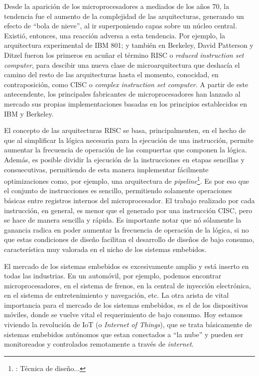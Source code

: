 \documentclass[a4paper]{article}
\begin{document}
Desde la aparición de los microprocesadores a mediados de los años 70, la tendencia fue el aumento de la complejidad de las arquitecturas, generando un efecto de ``bola de nieve'', al ir superponiendo capas sobre un núcleo central. Existió, entonces, una reacción adversa a esta tendencia. Por ejemplo, la arquitectura experimental de IBM 801; y también en Berkeley, David Patterson y Ditzel fueron los primeros en acuñar el término RISC o \emph{reduced instruction set computer}, para descibir una nueva clase de microarquitectura que deshacía el camino del resto de las arquitecturas hasta el momento, conocidad, en contraposición, como CISC o \emph{complex instruction set computer}. A partir de este antecendente, los principales fabricantes de microprocesadores han lanzado al mercado sus propias implementaciones basadas en los principios establecidos en IBM y Berkeley.

El concepto de las arquitecturas RISC se basa, principalmenten, en el hecho de que al simplificar la lógica necesaria para la ejecución de una instrucción, permite aumentar la frecuencia de operación de las compuertas que componen la lógica. Además, es posible dividir la ejecución de la instrucciones en etapas sencillas y consuecutivas, permitiendo de esta manera implementar fácilmente optimizaciones como, por ejemplo, una arquitectura de \emph{pipeline}\footnote{\label{Pipeline}: Técnica de diseño...}. Es por eso que el conjunto de instrucciones es sencillo, permitiendo solamente operaciones básicas entre registros internos del microprocesador. El trabajo realizado por cada instrucción, en general, es menor que el generado por una instrucción CISC, pero se hace de manera sencilla y rápida. Es importante notar que nó sólamente la ganancia radica en poder aumentar la frecuencia de operación de la lógica, si no que estas condiciones de diseño facilitan el desarrollo de diseños de bajo consumo, característica muy valorada en el nicho de los sistemas embebidos.

El mercado de los sistemas embebidos es excesivamente amplio y está inserto en todas las industrias. En un automóvil, por ejemplo, podemos encontrar microprocesadores, en el sistema de frenos, en la central de inyección electrónica, en el sistema de entretenimiento y navegación, etc. La otra arista de vital importancia para el mercado de los sistemas embebidos, es el de los dispositivos móviles, donde se vuelve vital el requerimiento de bajo consumo. Hoy estamos viviendo la revolución de IoT (o \emph{Internet of Things}), que se trata básicamente de sistemas embebidos autónomos que estan conectados a ``la nube'' y pueden ser monitoreados y controlados remotamente a través de \emph{internet}.
\end{document}
